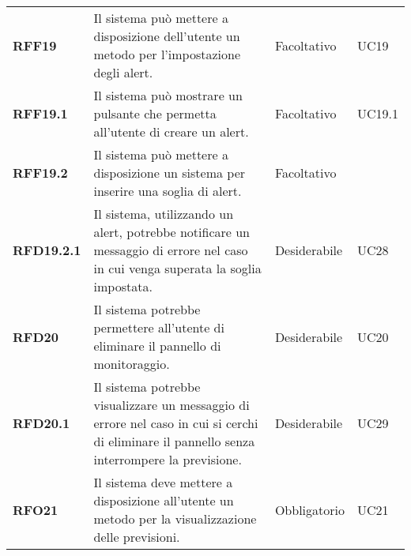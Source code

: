 \begin{longtable}[H]{>{\centering\bfseries}m{2cm} >{\centering}m{9cm} >{\centering}m{2.5cm} >{\centering\arraybackslash}m{2.5cm}}
  \textbf{RFF19} & Il sistema può mettere a disposizione dell’utente un metodo per l’impostazione degli alert. & Facoltativo & UC19 \\
  \textbf{RFF19.1} & Il sistema può mostrare un pulsante che permetta all'utente di creare un alert. & Facoltativo & UC19.1 \\
  \textbf{RFF19.2} & Il sistema può mettere a disposizione un sistema per inserire una soglia di alert. & Facoltativo & 19.2 \\
  \textbf{RFD19.2.1} & Il sistema, utilizzando un alert, potrebbe notificare un messaggio di errore nel caso in cui venga superata la soglia impostata. & Desiderabile & UC28 \\
  \textbf{RFD20} & Il sistema potrebbe permettere all'utente di eliminare il pannello di monitoraggio. & Desiderabile & UC20 \\
  \textbf{RFD20.1} & Il sistema potrebbe visualizzare un messaggio di errore nel caso in cui si cerchi di eliminare il pannello senza interrompere la previsione. & Desiderabile & UC29 \\
  \textbf{RFO21} & Il sistema deve mettere a disposizione all'utente un metodo per la visualizzazione delle previsioni. & Obbligatorio & UC21 \\
\end{longtable}
